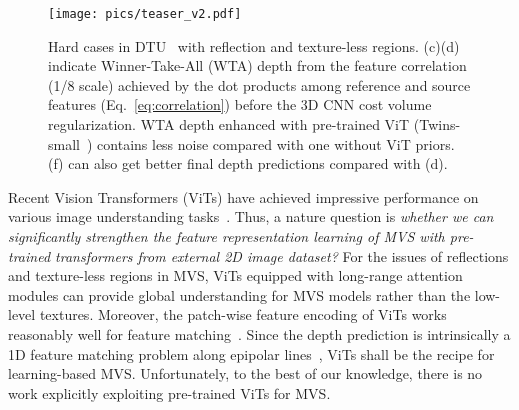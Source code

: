 \documentclass[10pt]{article} \usepackage[preprint]{tmlr}
\begin{document}
\begin{figure}
\begin{centering}
\texttt{[image: pics/teaser\_v2.pdf]} 
\par\end{centering}
\caption{Hard cases in DTU~\citep{aanaes2016large} with reflection and texture-less regions. (c)(d) indicate Winner-Take-All (WTA) depth from the feature correlation (1/8 scale) achieved by the dot products among reference and source features (Eq.~\ref{eq:correlation}) before the 3D CNN cost volume regularization. WTA depth enhanced with pre-trained ViT (Twins-small~\citep{chu2021twins}) contains less noise compared with one without ViT priors. (f) can also get better final depth predictions compared with (d).\label{fig:teaser}}
\vspace{-0.1in}
\end{figure}


Recent Vision Transformers (ViTs) have achieved impressive performance on various image understanding tasks~\citep{dosovitskiy2020image,caron2021emerging,wang2021pyramid,liu2021swin,chu2021twins,he2021masked}. 
Thus, a nature question is \textit{whether we can significantly strengthen the feature representation learning of MVS  with pre-trained transformers from external 2D image dataset?} 
For the issues of reflections and texture-less regions in MVS, ViTs equipped with long-range attention modules can provide global understanding for MVS models rather than the low-level textures. Moreover, the patch-wise feature encoding of ViTs works reasonably well for feature matching~\citep{sun2021loftr,jiang2021cotr}. Since the depth prediction is intrinsically a 1D feature matching problem along epipolar lines~\citep{furukawa2015multi}, ViTs shall be the recipe for learning-based MVS.
Unfortunately, to the best of our knowledge, there is no work explicitly exploiting pre-trained ViTs for MVS. 
\end{document}
